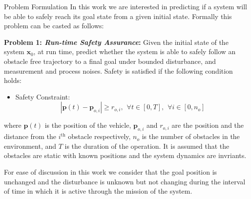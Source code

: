 	
\begin{section}{Problem Formulation} \label{sec:problem}
	In this work we are interested in predicting if a system will be able to safely reach its goal state from a given initial state. Formally this problem can be casted as follows:
	
	\textbf{Problem 1: \textit{Run-time Safety Assurance}:}
	Given the initial state of the system $ \boldsymbol{x}_0 $, at run time, predict whether the system is able to safely follow an obstacle free trajectory to a final goal under bounded disturbance, and measurement and process noises. Safety is satisfied if the following condition holds:
	\begin{itemize}
		\item{Safety Constraint:}	
		\[ | \boldsymbol{p}(t) -\boldsymbol{p}_{o,i} | \geq r_{o,i}, \hspace{5pt} \forall t \in [0,T], \hspace{5pt} \forall i \in [0,n_o] \]	
	\end{itemize}
	where $ \boldsymbol{p}(t) $ is the position of the vehicle, $ \boldsymbol{p}_{o,i} $ and $ r_{o,i} $ are the position and the distance from the $ i^{\text{th}} $ obstacle respectively, $ n_o $ is the number of obstacles in the environment, and $ T $ is the duration of the operation. It is assumed that the obstacles are static with known positions and the system dynamics are invriants.
	\end{section}
	For ease of discussion in this work we consider that the goal position is unchanged and the disturbance is unknown but not changing during the interval of time in which it is active through the mission of the system. 
